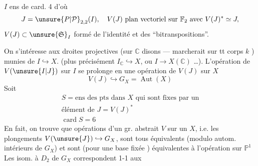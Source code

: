 
$I$ ens de card. 4 d'où
\[
J=\unsure{P|\mathcal P}_{2,2}(I),\quad V(J)\ \text{plan vectoriel sur }\mathbb F_2\text{ avec }V(J)^*\simeq J,
\]
$V(J)\subset\unsure{\mathfrak S}_I$ formé de l'identité et des ``bitranspositions''.

On s'intéresse aux droites projectives (sur $\mathbb C$ disons --- 
marcherait sur tt corps $k$ ) munies de $I\hookrightarrow X$.
(plus précisément $I_{\mathbb C}\hookrightarrow X$, ou $I\longrightarrow X(\mathbb C)$ \ldots).
L'opération de $V(\unsure{I|J})$ sur $I$ se prolonge en une opération de
$V(J)$ sur $X$
\[
V(J)\hookrightarrow G_X=\operatorname{Aut}(X)
\]
Soit
\[
\begin{gathered}
S=\text{ens des pts dans }X\text{ qui sont fixes par un}\\
\text{élément de }J=V(J)^*\\
\operatorname{card}S=6
\end{gathered}
\]
En fait, on trouve que  opérations  d'un gr. abstrait $V$
sur un $X$, i.e. les plongements $V(\unsure{J})\hookrightarrow G_X$, sont tous
équivalents (modulo autom. intérieurs de $G_X$)
et sont (pour une base fixée ) équivalentes à l'opération sur $\mathbb P^1$
Les  isom. à $D_2$ de $G_X$ correspondent 1-1 aux
